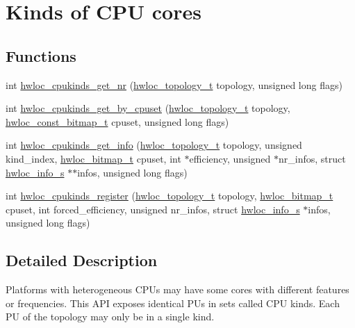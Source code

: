 \hypertarget{a00213}{}\section{Kinds of C\+PU cores}
\label{a00213}
\subsection*{Functions}
\begin{DoxyCompactItemize}
\item 
int \hyperlink{a00213_ga7553f7c6d3920b169f3fc18dfe6a33e3}{hwloc\+\_\+cpukinds\+\_\+get\+\_\+nr} (\hyperlink{a00186_ga9d1e76ee15a7dee158b786c30b6a6e38}{hwloc\+\_\+topology\+\_\+t} topology, unsigned long flags)
\item 
int \hyperlink{a00213_gaf979833aab18d2e7f4b17c932cbcf5d8}{hwloc\+\_\+cpukinds\+\_\+get\+\_\+by\+\_\+cpuset} (\hyperlink{a00186_ga9d1e76ee15a7dee158b786c30b6a6e38}{hwloc\+\_\+topology\+\_\+t} topology, \hyperlink{a00205_gae991a108af01d408be2776c5b2c467b2}{hwloc\+\_\+const\+\_\+bitmap\+\_\+t} cpuset, unsigned long flags)
\item 
int \hyperlink{a00213_gae1b38fbe9c645583fc16052ce6fbb275}{hwloc\+\_\+cpukinds\+\_\+get\+\_\+info} (\hyperlink{a00186_ga9d1e76ee15a7dee158b786c30b6a6e38}{hwloc\+\_\+topology\+\_\+t} topology, unsigned kind\+\_\+index, \hyperlink{a00205_gaa3c2bf4c776d603dcebbb61b0c923d84}{hwloc\+\_\+bitmap\+\_\+t} cpuset, int $\ast$efficiency, unsigned $\ast$nr\+\_\+infos, struct \hyperlink{a00286}{hwloc\+\_\+info\+\_\+s} $\ast$$\ast$infos, unsigned long flags)
\item 
int \hyperlink{a00213_ga6164ba92cfd06f530ec2c4a18a0dd5a9}{hwloc\+\_\+cpukinds\+\_\+register} (\hyperlink{a00186_ga9d1e76ee15a7dee158b786c30b6a6e38}{hwloc\+\_\+topology\+\_\+t} topology, \hyperlink{a00205_gaa3c2bf4c776d603dcebbb61b0c923d84}{hwloc\+\_\+bitmap\+\_\+t} cpuset, int forced\+\_\+efficiency, unsigned nr\+\_\+infos, struct \hyperlink{a00286}{hwloc\+\_\+info\+\_\+s} $\ast$infos, unsigned long flags)
\end{DoxyCompactItemize}


\subsection{Detailed Description}
Platforms with heterogeneous C\+P\+Us may have some cores with different features or frequencies. This A\+PI exposes identical P\+Us in sets called C\+PU kinds. Each PU of the topology may only be in a single kind.

